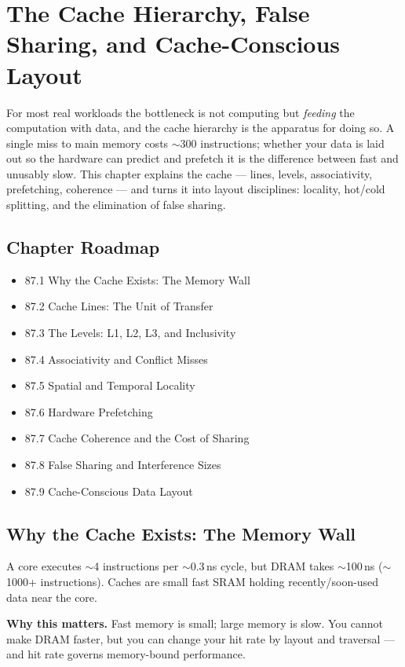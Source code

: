 \chapter{The Cache Hierarchy, False Sharing, and Cache-Conscious Layout}

For most real workloads the bottleneck is not computing but \emph{feeding} the computation with data, and the cache hierarchy is the apparatus for doing so. A single miss to main memory costs $\sim$300 instructions; whether your data is laid out so the hardware can predict and prefetch it is the difference between fast and unusably slow. This chapter explains the cache --- lines, levels, associativity, prefetching, coherence --- and turns it into layout disciplines: locality, hot/cold splitting, and the elimination of false sharing.

\section*{Chapter Roadmap}
\begin{itemize}
\item 87.1 Why the Cache Exists: The Memory Wall
\item 87.2 Cache Lines: The Unit of Transfer
\item 87.3 The Levels: L1, L2, L3, and Inclusivity
\item 87.4 Associativity and Conflict Misses
\item 87.5 Spatial and Temporal Locality
\item 87.6 Hardware Prefetching
\item 87.7 Cache Coherence and the Cost of Sharing
\item 87.8 False Sharing and Interference Sizes
\item 87.9 Cache-Conscious Data Layout
\end{itemize}

\section{Why the Cache Exists: The Memory Wall}
A core executes $\sim$4 instructions per $\sim$0.3\,ns cycle, but DRAM takes $\sim$100\,ns ($\sim$1000+ instructions). Caches are small fast SRAM holding recently/soon-used data near the core.

\textbf{Why this matters.} Fast memory is small; large memory is slow. You cannot make DRAM faster, but you can change your hit rate by layout and traversal --- and hit rate governs memory-bound performance.

